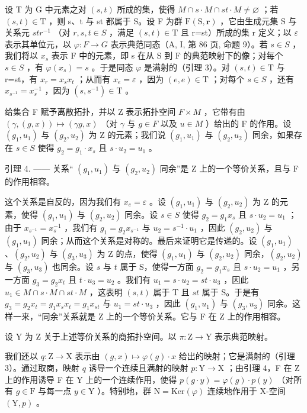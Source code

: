 设 T 为 G 中元素之对 \((s,t)\) 所成的集，使得 \(M\cap s\cdot M\cap st\cdot M\neq\varnothing\) ；若 \((s,t)\in\mathrm{T}\) ，则 s、t 与 st 都属于 S。设 F 为群 \(\mathrm{F}(\mathrm{S},\mathbf{r})\) ，它由生成元集 S 与关系元 \(str^{-1}\) （对 \(r,s,t\in S\) ，满足 \((s,t)\in\mathrm{T}\) 且 r=st）所成的集 r 定义；以 \(\varepsilon\) 表示其单位元，以 \(\varphi\colon F\to G\) 表示典范同态（A, I, 第 86 页, 命题 9）。若 \(s\in S\) ，我们将以 \(x_{s}\) 表示 F 中的元素，即 s 在从 S 到 F 的典范映射下的像；对每个 \(s\in S\) ，有 \(\varphi(x_{s})=s\) 。于是同态 \(\varphi\) 是满射的（引理 3）。对 \((s,t)\in\mathrm{T}\) 与 r=st，有 \(x_{r}=x_{s}x_{t}\) ；从而有 \(x_{e}=\varepsilon\) ，因为 \((e,e)\in\mathrm{T}\) ；对每个 \(s\in S\) ，还有 \(x_{s^{-1}}=x_{s}^{-1}\) ，因为 \((s,s^{-1})\in\mathrm{T}\) 。

给集合 F 赋予离散拓扑，并以 Z 表示拓扑空间 \(F \times M\) ，它带有由 \((\gamma, (g, x)) \mapsto (\gamma g, x)\) （对 \(\gamma\) 与 \(g \in F\) 以及 \(u \in M\) ）给出的 F 的作用。设 \((g_{1}, u_{1})\) 与 \((g_{2}, u_{2})\) 为 Z 的元素；我们说 \((g_{1}, u_{1})\) 与 \((g_{2}, u_{2})\) 同余，如果存在 \(s \in S\) 使得 \(g_{2} = g_{1} \cdot x_{s}\) 且 \(s \cdot u_{2} = u_{1}\) 。

引理 4. —— 关系“ \((g_{1}, u_{1})\) 与 \((g_{2}, u_{2})\) 同余”是 Z 上的一个等价关系，且与 F 的作用相容。

这个关系是自反的，因为我们有 \(x_e = \varepsilon\) 。设 \((g_1, u_1)\) 与 \((g_2, u_2)\) 为 Z 的元素，使得 \((g_1, u_1)\) 与 \((g_2, u_2)\) 同余。设 \(s \in S\) 使得 \(g_2 = g_1 x_s\) 且 \(s \cdot u_2 = u_1\) ；由于 \(x_{s^{-1}} = x_s^{-1}\) ，我们有 \(g_1 = g_2 x_{s^{-1}}\) 与 \(u_2 = s^{-1} \cdot u_1\) ，因此 \((g_2, u_2)\) 与 \((g_1, u_1)\) 同余；从而这个关系是对称的。最后来证明它是传递的。设 \((g_1, u_1)\) 、\((g_2, u_2)\) 与 \((g_3, u_3)\) 为 Z 的点，使得 \((g_1, u_1)\) 与 \((g_2, u_2)\) 同余，\((g_2, u_2)\) 与 \((g_3, u_3)\) 也同余。设 \(s\) 与 \(t\) 属于 S，使得一方面 \(g_2 = g_1 x_s\) 且 \(s \cdot u_2 = u_1\) ，另一方面 \(g_3 = g_2 x_t\) 且 \(t \cdot u_3 = u_2\) 。我们有 \(u_1 = s \cdot u_2 = st \cdot u_3\) ，因此 \(u_1 \in M \cap s \cdot M \cap st \cdot M\) ，这表明 \((s, t)\) 属于 T 且 \(st\) 属于 S。于是有 \(g_3 = g_2 x_t = g_1 x_s x_t = g_1 x_{st}\) 与 \(u_1 = st \cdot u_3\) ，因此 \((g_1, u_1)\) 与 \((g_3, u_3)\) 同余。这样一来，“同余”关系就是 Z 上的一个等价关系。它与 F 在 Z 上的作用相容。

设 Y 为 Z 关于上述等价关系的商拓扑空间。以 \(\pi\colon\mathrm{Z}\to\mathrm{Y}\) 表示典范映射。

我们还以 \(q \colon \mathrm{Z} \to \mathrm{X}\) 表示由 \((g, x) \mapsto \varphi(g) \cdot x\) 给出的映射；它是满射的（引理 3）。通过取商，映射 \(q\) 诱导一个连续且满射的映射 \(p \colon \mathrm{Y} \to \mathrm{X}\) ；由引理 4，F 在 Z 上的作用诱导 F 在 Y 上的一个连续作用，使得 \(p(g \cdot y) = \varphi(g) \cdot p(y)\) （对所有 \(g \in \mathrm{F}\) 与每一点 \(y \in \mathrm{Y}\) ）。特别地，群 \(\mathrm{N} = \mathrm{Ker}(\varphi)\) 连续地作用于 X-空间 \((\mathrm{Y}, p)\) 。

